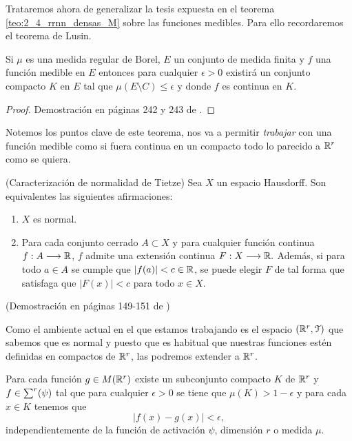 %

Trataremos ahora de generalizar la tesis expuesta en 
 el teorema \ref{teo:2_4_rrnn_densas_M} sobre las funciones medibles. 
 Para ello recordaremos el teorema de Lusin.
\begin{teorema} \label{teo:Lusin}
    Si $\mu$ es una medida regular de Borel, $E$ un conjunto de medida finita 
    y $f$ una función medible en $E$ entonces
    para cualquier $\epsilon > 0$ existirá un conjunto compacto 
    $K$ en $E$ tal que $\mu(E \setminus C) \leq \epsilon$ y donde $f$ es continua en $K$. 
\end{teorema}
\begin{proof}
    Demostración en páginas 242 y 243 de \cite{nla.cat-vn1819421}.
\end{proof}  

Notemos los puntos clave de este teorema, nos va a permitir \textit{trabajar} con una función medible como si fuera continua en un compacto
todo lo parecido a $\mathbb{R}^r$ como se quiera. 
 
\begin{teorema}(Caracterización de normalidad de Tietze)\label{teo:Tietze}
    Sea $X$ un espacio Hausdorff. Son equivalentes las siguientes afirmaciones: 
    \begin{enumerate}
        \item $X$ es normal.
        \item Para cada conjunto cerrado $A \subset X$ y para cualquier función continua 
        $f: A \longrightarrow \mathbb{R}$, $f$ admite una extensión continua $F:X \longrightarrow \mathbb{R}.$
        Además, si para todo $a \in A$ se cumple que $|f(a)| < c \in \mathbb{R}$, se puede elegir $F$
        de tal forma que satisfaga que $|F(x)| < c$ para todo $x\in X.$ 
    \end{enumerate}
    (Demostración en páginas 149-151 de \cite{james1966topology})
\end{teorema}

Como el ambiente actual en el que estamos trabajando 
es el espacio $(\mathbb{R}^r, \mathcal{T})$ que sabemos que es normal y puesto que es habitual que nuestras funciones estén definidas
en  compactos de $\mathbb{R}^r$, las podremos extender a $\mathbb{R}^r$. 


\begin{corolario} \label{cor:2_1}
    Para cada función $g \in M(\mathbb{R}^r)$ existe un subconjunto compacto 
    $K$ de $\mathbb{R}^r$ y $f \in \sum^r (\psi)$ tal que para cualquier 
    $\epsilon > 0$ se tiene que 
    $\mu(K) > 1- \epsilon$ y para cada $x \in K$ tenemos que 
    \begin{equation}
        |f(x) - g(x) | < \epsilon,
    \end{equation}
    independientemente de la función de activación $\psi$, dimensión $r$ o medida $\mu$. 
\end{corolario}

